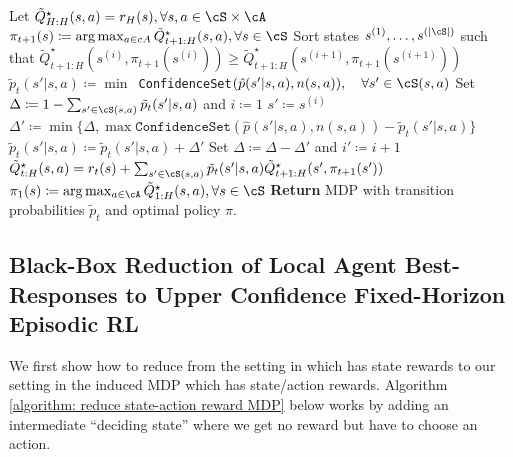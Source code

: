 \documentclass{article}
\theoremstyle{plain}
\theoremstyle{definition}
\begin{document}
\begin{algorithm}[hbt]\begin{algorithmic}\caption{\texttt{FixedHorizonEVI}$(\cM)$ \cite{dann2015sample}}
    \STATE Let $\tilde{Q}^\star_{H:H}(s,a) = r_H(s), \forall  s,a\in \cS\times\cA$
    \STATE $\pi_{t+1}(s) \coloneqq \arg\max_{a\in cA} \tilde{Q}^\star_{t+1:H}(s,a), \forall s\in \cS$
    \STATE Sort states $s^{(1)},\dots,s^{(|\cS|)}$ such that
    $\tilde{Q}_{t+1:H}^\star(s^{(i)}, \pi_{t+1}(s^{(i)})) \geq \tilde{Q}_{t+1:H}^\star(s^{(i+1)}, \pi_{t+1}(s^{(i+1)}))$
    \STATE $\tilde{p}_t(s'|s,a)\coloneqq \min  $\texttt{ ConfidenceSet}$(\hat{p}(s'|s,a), n(s,a)), \quad \forall s'\in \cS(s,a)$
    \STATE Set $\Delta\coloneqq 1 - \sum_{s'\in \cS(s,a)}\tilde{p}_t(s'|s,a)$ and $i\coloneqq 1$
    \STATE $s'\coloneqq s^{(i)}$
    \STATE $\Delta' \coloneqq \min\{\Delta, \max \texttt{ConfidenceSet}(\hat{p}(s'|s,a), n(s,a)) - \tilde{p}_t(s'|s,a)\}$
    \STATE $\tilde{p}_t(s'|s,a)\coloneqq \tilde{p}_t(s'|s,a) + \Delta'$
    \STATE Set $\Delta\coloneqq \Delta - \Delta'$ and $i' \coloneqq i+1$
    \ENDWHILE
    \STATE $\tilde{Q}^\star_{t:H}(s,a) = r_t(s) + \sum_{s'\in \cS(s,a)}\tilde{p}_t(s'|s,a)\tilde{Q}_{t+1:H}^\star(s', \pi_{t+1}(s'))$
    \ENDFOR
    \ENDFOR
    \STATE $\pi_1(s) \coloneqq \arg\max_{a\in\cA} \tilde{Q}_{1:H}^\star(s,a), \forall s\in \cS$
    \STATE \textbf{Return} MDP with transition probabilities $\tilde{p}_t$ and optimal policy $\pi$.
    \end{algorithmic}  
\end{algorithm}
 
\subsection{Black-Box Reduction of Local Agent Best-Responses to Upper Confidence Fixed-Horizon Episodic RL}
We first show how to reduce from the setting in \citet{dann2015sample} which has state rewards to our setting in the induced MDP which has state/action rewards. Algorithm \ref{algorithm: reduce state-action reward MDP} below works by adding an intermediate ``deciding state'' where we get no reward but have to choose an action.\\
\end{document}
